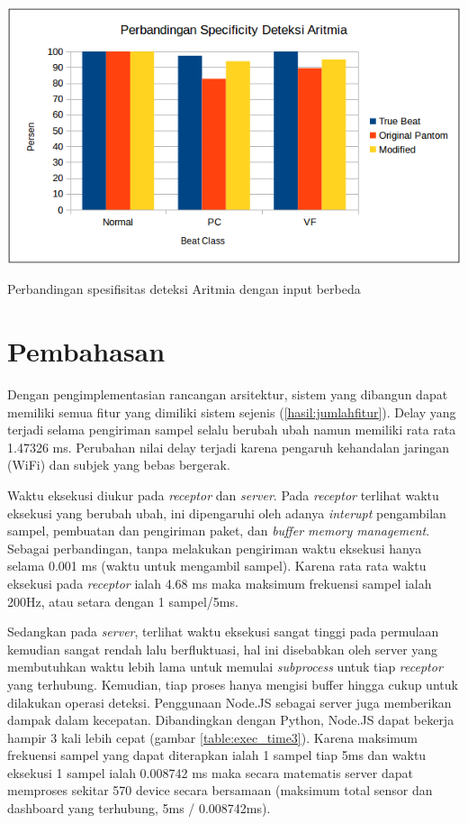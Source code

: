 \begin{table}[H]
	\centering
	\includegraphics[scale=0.7]{images/aritmia_sp.png}
	\caption{Perbandingan spesifisitas deteksi Aritmia dengan input berbeda}
	\label{fig:aritmia_specificity}
\end{table}

\section{Pembahasan}
Dengan pengimplementasian rancangan arsitektur, sistem yang dibangun dapat memiliki semua fitur yang dimiliki sistem sejenis (\ref{hasil:jumlahfitur}). Delay yang terjadi selama pengiriman sampel selalu berubah ubah namun memiliki rata rata 1.47326 ms. Perubahan nilai delay terjadi karena pengaruh kehandalan jaringan (WiFi) dan subjek yang bebas bergerak. 

Waktu eksekusi diukur pada \textit{receptor} dan \textit{server}. Pada \textit{receptor} terlihat waktu eksekusi yang berubah ubah, ini dipengaruhi oleh adanya \textit{interupt} pengambilan sampel, pembuatan dan pengiriman paket, dan \textit{buffer memory management}. Sebagai perbandingan, tanpa melakukan pengiriman waktu eksekusi hanya selama 0.001 ms (waktu untuk mengambil sampel). Karena rata rata waktu eksekusi pada \textit{receptor} ialah 4.68 ms maka maksimum frekuensi sampel ialah 200Hz, atau setara dengan 1 sampel/5ms. 

Sedangkan pada \textit{server}, terlihat waktu eksekusi sangat tinggi pada permulaan kemudian sangat rendah lalu berfluktuasi, hal ini disebabkan oleh server yang membutuhkan waktu lebih lama untuk memulai \textit{subprocess} untuk tiap \textit{receptor} yang terhubung. Kemudian, tiap proses hanya mengisi buffer hingga cukup untuk dilakukan operasi deteksi. Penggunaan Node.JS sebagai server juga memberikan dampak dalam kecepatan. Dibandingkan dengan Python, Node.JS dapat bekerja hampir 3 kali lebih cepat (gambar \ref{table:exec_time3}). Karena maksimum frekuensi sampel yang dapat diterapkan ialah 1 sampel tiap 5ms dan waktu eksekusi 1 sampel ialah 0.008742 ms maka secara matematis server dapat memproses sekitar 570 device secara bersamaan (maksimum total sensor dan dashboard yang terhubung, 5ms / 0.008742ms).


